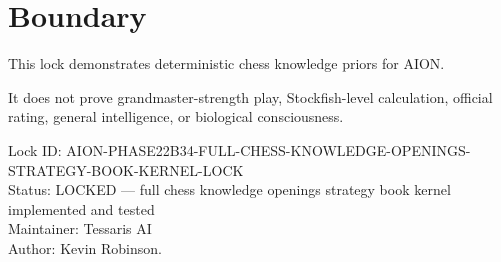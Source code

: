 \documentclass[11pt,a4paper]{article}
\begin{document}
\section{Boundary}

This lock demonstrates deterministic chess knowledge priors for AION.

It does not prove grandmaster-strength play, Stockfish-level calculation, official rating, general intelligence, or biological consciousness.

\bigskip

\noindent
Lock ID: AION-PHASE22B34-FULL-CHESS-KNOWLEDGE-OPENINGS-STRATEGY-BOOK-KERNEL-LOCK\\
Status: LOCKED --- full chess knowledge openings strategy book kernel implemented and tested\\
Maintainer: Tessaris AI\\
Author: Kevin Robinson.
\end{document}
